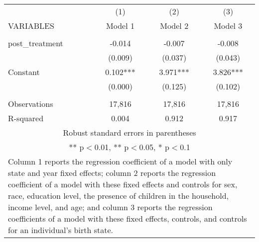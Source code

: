 \begin{tabular}{lccc}
\hline
 & (1) & (2) & (3) \\
VARIABLES & Model 1 & Model 2 & Model 3 \\ \hline
 &  &  &  \\
post\_treatment & -0.014 & -0.007 & -0.008 \\
 & (0.009) & (0.037) & (0.043) \\
Constant & 0.102*** & 3.971*** & 3.826*** \\
 & (0.000) & (0.125) & (0.102) \\
 &  &  &  \\
Observations & 17,816 & 17,816 & 17,816 \\
 R-squared & 0.004 & 0.912 & 0.917 \\ \hline
\multicolumn{4}{c}{\small Robust standard errors in parentheses} \\
\multicolumn{4}{c}{\small *** p$<$0.01, ** p$<$0.05, * p$<$0.1} \\
\multicolumn{4}{p{0.8\linewidth}}{\small Column 1 reports the
regression coefficient of a model with only state and year fixed effects; column 2 reports the
regression coefficient of a model with these fixed effects and controls for sex, race, education
level, the presence of children in the household, income level, and age; and column 3 reports
the regression coefficients of a model with these fixed effects, controls, and controls for an
individual’s birth state.} \\
\end{tabular}
